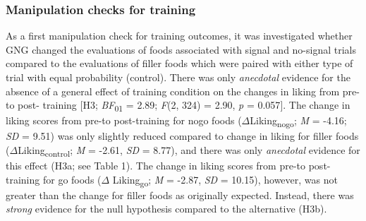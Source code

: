 \documentclass[man,floatsintext]{apa6}
\begin{document}
\hypertarget{manipulation_checks}{%
\subsubsection{Manipulation checks for training}\label{manipulation_checks}}

\par

As a first manipulation check for training outcomes, it was investigated whether GNG changed the evaluations of foods associated with signal and no-signal trials compared to the evaluations of filler foods which were paired with either type of trial with equal probability (control). There was only \emph{anecdotal} evidence for the absence of a general effect of training condition on the changes in liking from pre- to post- training {[}H3; \emph{BF}\textsubscript{01} = 2.89; \emph{F}(2, 324) = 2.90, \emph{p} = 0.057{]}. The change in liking scores from pre-to post-training for nogo foods (\(\Delta\)Liking\textsubscript{nogo}; \emph{M} = -4.16; \emph{SD} = 9.51) was only slightly reduced compared to change in liking for filler foods (\(\Delta\)Liking\textsubscript{control}; \emph{M} = -2.61, \emph{SD} = 8.77), and there was only \emph{anecdotal} evidence for this effect (H3a; see Table 1). The change in liking scores from pre-to post-training for go foods (\(\Delta\) Liking\textsubscript{go}; \emph{M} = -2.87, \emph{SD} = 10.15), however, was not greater than the change for filler foods as originally expected. Instead, there was \emph{strong} evidence for the null hypothesis compared to the alternative (H3b).
\end{document}
